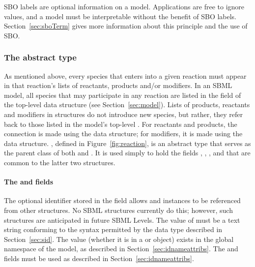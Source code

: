 SBO labels are optional information on a model.  Applications are
free to ignore  values, and a model must be
interpretable without the benefit of SBO labels.
Section~\ref{sec:sboTerm} gives more information about this
principle and the use of SBO.


\subsubsection{The  abstract type}
\label{subsec:simplespeciesreference}

As mentioned above, every species that enters into a given
reaction must appear in that reaction's lists of reactants,
products and/or modifiers.  In an SBML model, all species that may
participate in any reaction are listed in the
 field of the top-level \Model data structure
(see Section~\ref{sec:model}).  Lists of products, reactants and
modifiers in \Reaction structures do not introduce new species,
but rather, they refer back to those listed in the model's
top-level .  For reactants and products, the
connection is made using the \SpeciesReference data structure; for
modifiers, it is made using the \ModifierSpeciesReference data
structure.  \SimpleSpeciesReference, defined in
Figure~\vref{fig:reaction}, is an abstract type that serves as the
parent class of both \SpeciesReference and
\ModifierSpeciesReference.  It is used simply to hold the fields
, , , and 
that are common to the latter two structures.


\paragraph{The  and  fields}

The optional identifier stored in the  field allows
\SpeciesReference and \ModifierSpeciesReference instances to be
referenced from other structures.  No SBML structures currently do
this; however, such structures are anticipated in future SBML
Levels.  The value of  must be a text string conforming
to the syntax permitted by the  data type described
in Section~\ref{sec:sid}.  The  value (whether it is in
a \SpeciesReference or \ModifierSpeciesReference object) exists in
the global namespace of the model, as described in
Section~\ref{sec:idnameattribs}.  The  and 
fields must be used as described in
Section~\ref{sec:idnameattribs}.


